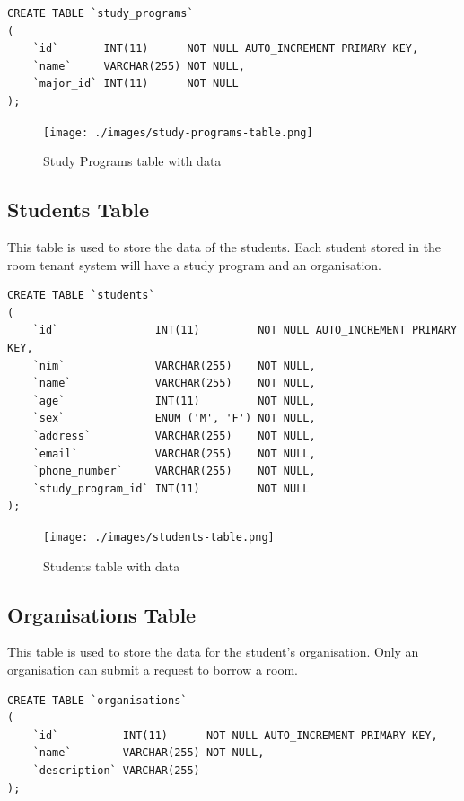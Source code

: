 \documentclass[12pt,titlepage]{article}
\begin{document}
\begin{verbatim}
CREATE TABLE `study_programs`
(
    `id`       INT(11)      NOT NULL AUTO_INCREMENT PRIMARY KEY,
    `name`     VARCHAR(255) NOT NULL,
    `major_id` INT(11)      NOT NULL
);
\end{verbatim}

\begin{figure}[h]
    \centering
    \texttt{[image: ./images/study-programs-table.png]}
    \caption{Study Programs table with data}
\end{figure}

\subsection{Students Table}
This table is used to store the data of the students. Each student stored in the room tenant system will have a study program
and an organisation.

\begin{verbatim}
CREATE TABLE `students`
(
    `id`               INT(11)         NOT NULL AUTO_INCREMENT PRIMARY KEY,
    `nim`              VARCHAR(255)    NOT NULL,
    `name`             VARCHAR(255)    NOT NULL,
    `age`              INT(11)         NOT NULL,
    `sex`              ENUM ('M', 'F') NOT NULL,
    `address`          VARCHAR(255)    NOT NULL,
    `email`            VARCHAR(255)    NOT NULL,
    `phone_number`     VARCHAR(255)    NOT NULL,
    `study_program_id` INT(11)         NOT NULL
);
\end{verbatim}

\begin{figure}[h]
    \centering
    \texttt{[image: ./images/students-table.png]}
    \caption{Students table with data}
\end{figure}

\pagebreak

\subsection{Organisations Table}
This table is used to store the data for the student's organisation. 
Only an organisation can submit a request to borrow a room.

\begin{verbatim}
CREATE TABLE `organisations`
(
    `id`          INT(11)      NOT NULL AUTO_INCREMENT PRIMARY KEY,
    `name`        VARCHAR(255) NOT NULL,
    `description` VARCHAR(255)
);
\end{verbatim}
\end{document}
